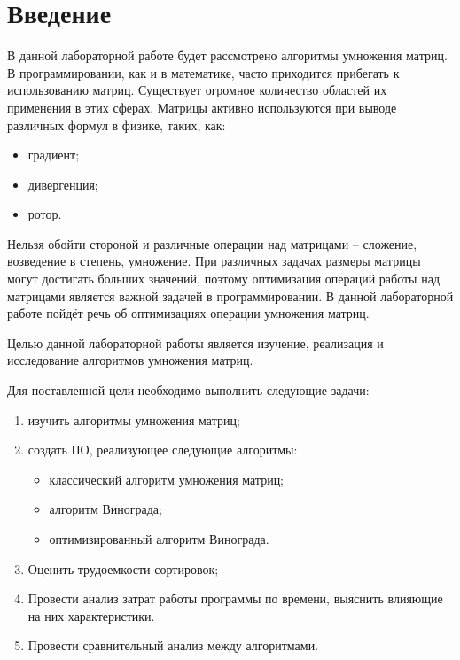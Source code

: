 \chapter*{Введение}

В данной лабораторной работе будет рассмотрено алгоритмы умножения матриц. В программировании, как и в математике, часто приходится прибегать к использованию матриц. Существует огромное количество областей их применения в этих сферах. Матрицы активно используются при выводе различных формул в физике, таких, как:
\begin{itemize}
	\item градиент;
	\item дивергенция;
	\item ротор.
\end{itemize}

Нельзя обойти стороной и различные операции над матрицами – сложение, возведение в степень, умножение. При различных задачах размеры матрицы могут достигать больших значений, поэтому оптимизация операций работы над матрицами является важной задачей в программировании. В данной лабораторной работе пойдёт речь об оптимизациях операции умножения матриц.

Целью данной лабораторной работы является изучение, реализация и исследование алгоритмов умножения матриц.

Для поставленной цели необходимо выполнить следующие задачи:
\begin{enumerate}[label={\arabic*)}]
	\item изучить алгоритмы умножения матриц;
	\item создать ПО, реализующее следующие алгоритмы:
	\begin{itemize}
		\item классический алгоритм умножения матриц;
		\item алгоритм Винограда;
		\item оптимизированный алгоритм Винограда.
	\end{itemize}
	\item Оценить трудоемкости сортировок;
	\item Провести анализ затрат работы программы по времени, выяснить влияющие на них характеристики.
	\item Провести сравнительный анализ между алгоритмами.
\end{enumerate}